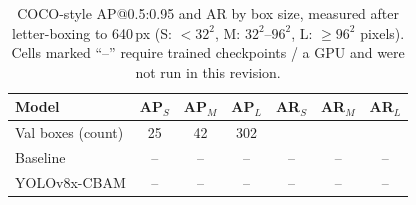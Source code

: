 \begin{table}[!t]
\centering
\caption{COCO-style AP@0.5:0.95 and AR by box size, measured after letter-boxing to 640\,px
(S: $<32^2$, M: $32^2$--$96^2$, L: $\geq96^2$ pixels). Cells marked ``--'' require trained checkpoints / a GPU and were not run in this revision.}
\label{tab:sizeap}
\setlength{\tabcolsep}{3pt}
\begin{tabular}{lcccccc}
\toprule
Model & AP$_S$ & AP$_M$ & AP$_L$ & AR$_S$ & AR$_M$ & AR$_L$ \\
\midrule
Val boxes (count) & 25 & 42 & 302 & & & \\
Baseline & -- & -- & -- & -- & -- & -- \\
YOLOv8x-CBAM & -- & -- & -- & -- & -- & -- \\
\bottomrule
\end{tabular}
\end{table}
